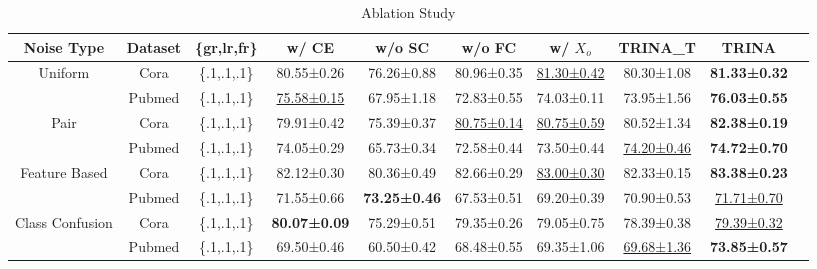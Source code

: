 \documentclass[sigconf, anonymous, review]{acmart}
\begin{document}
    \begin{table}
      \centering
      \caption{Ablation Study}
      {\small
      \begin{tabular}{cccccccccc}
        \toprule
        Noise Type &Dataset&\{gr,lr,fr\} & w/ CE & w/o SC & w/o FC & w/ $X_o$ & TRINA\_T &TRINA\\      
        \midrule
        \multirow{2}{*}{Uniform} & Cora &\{.1,.1,.1\}&80.55±0.26&76.26±0.88&80.96±0.35&\underline{81.30±0.42}&80.30±1.08&\textbf{81.33±0.32}\\        
        & Pubmed &\{.1,.1,.1\}&\underline{75.58±0.15}&67.95±1.18&72.83±0.55&74.03±0.11&73.95±1.56&\textbf{76.03±0.55}\\        
        \midrule
        \multirow{2}{*}{Pair} & Cora &\{.1,.1,.1\}&79.91±0.42&	75.39±0.37&\underline{80.75±0.14}&\underline{80.75±0.59}&80.52±1.34&\textbf{82.38±0.19}\\
        & Pubmed &\{.1,.1,.1\}&74.05±0.29&65.73±0.34&72.58±0.44&73.50±0.44&\underline{74.20±0.46}&\textbf{74.72±0.70}\\
        \midrule
        \multirow{2}{*}{Feature Based} & Cora &\{.1,.1,.1\}&82.12±0.30&80.36±0.49&82.66±0.29&\underline{83.00±0.30}&82.33±0.15	&\textbf{83.38±0.23}\\
        & Pubmed&\{.1,.1,.1\}& 71.55±0.66&\textbf{73.25±0.46}&67.53±0.51&69.20±0.39	&70.90±0.53	&\underline{71.71±0.70}\\
        \midrule
        \multirow{2}{*}{Class Confusion} & Cora &\{.1,.1,.1\}&\textbf{80.07±0.09}&75.29±0.51&79.35±0.26&79.05±0.75&78.39±0.38&\underline{79.39±0.32}\\
        & Pubmed &\{.1,.1,.1\}&69.50±0.46&60.50±0.42&68.48±0.55	&69.35±1.06	&\underline{69.68±1.36}&\textbf{73.85±0.57}\\        
        \bottomrule
      \end{tabular}}
      \label{tab:ablation}
    \end{table}
\end{document}
